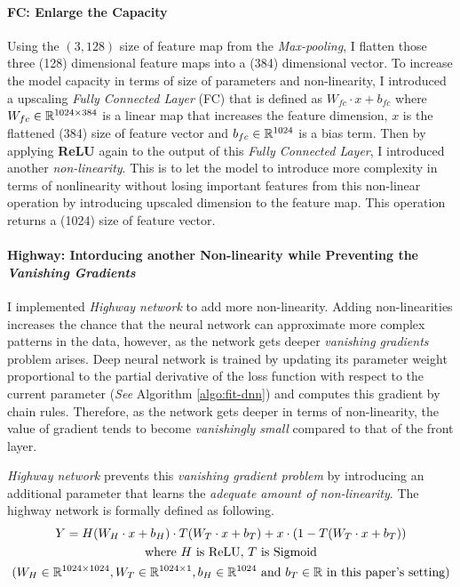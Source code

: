 \documentclass[12pt,letterpaper]{article}
\begin{document}
\paragraph{FC: Enlarge the Capacity}
Using the $(3, 128)$ size of feature map from the \textit{Max-pooling}, I flatten those three (128) dimensional feature maps into a (384) dimensional vector.
To increase the model capacity in terms of size of parameters and non-linearity, I introduced a upscaling \textit{Fully Connected Layer} (FC) that is defined as $W_{fc} \cdot x + b_{fc}$ where $W_{fc} \in \Bbb R^{1024 \times 384}$ is a linear map that increases the feature dimension, $x$ is the flattened (384) size of feature vector and $b_{fc} \in \Bbb R^{1024}$ is a bias term. %
Then by applying \textbf{ReLU} again to the output of this \textit{Fully Connected Layer}, I introduced another \textit{non-linearity}. This is to let the model
to introduce more complexity in terms of nonlinearity without losing important features
from this non-linear operation by introducing upscaled dimension to the feature map. This operation returns a (1024) size of feature vector.

\paragraph{Highway: Intorducing another Non-linearity while Preventing the \textit{Vanishing Gradients}}
I implemented \textit{Highway network} \citep{highway} to add more non-linearity. Adding non-linearities increases the chance that the neural network can approximate more complex patterns in the data, however, as the network gets deeper \textit{vanishing gradients} problem arises.
Deep neural network is trained by updating its parameter weight proportional to the partial derivative of the loss function with respect to the current parameter (\textit{See} Algorithm \ref{algo:fit-dnn}) and computes this gradient by chain rules. Therefore, as the network gets deeper in terms of non-linearity, the value of gradient tends to become \textit{vanishingly small} compared to that of the front layer.

\textit{Highway network} prevents this \textit{vanishing gradient problem} by introducing an additional parameter that learns the \textit{adequate amount of non-linearity}. The highway network is formally defined as following.
\begin{gather}
 \nonumber Y = H(W_H \cdot x + b_H) \cdot T(W_T \cdot x + b_T) + x \cdot (1-T(W_T \cdot x + b_T)) \\
 \nonumber \text{where } H \text{ is ReLU, }  T \text{ is Sigmoid}\\
 \nonumber (W_H \in \Bbb R^{1024 \times 1024}, W_T \in \Bbb R^{1024 \times 1}, b_H \in \Bbb R^{1024} \text{ and } b_T \in \Bbb R \text{ in this paper's setting})
\end{gather}
 
\end{document}
